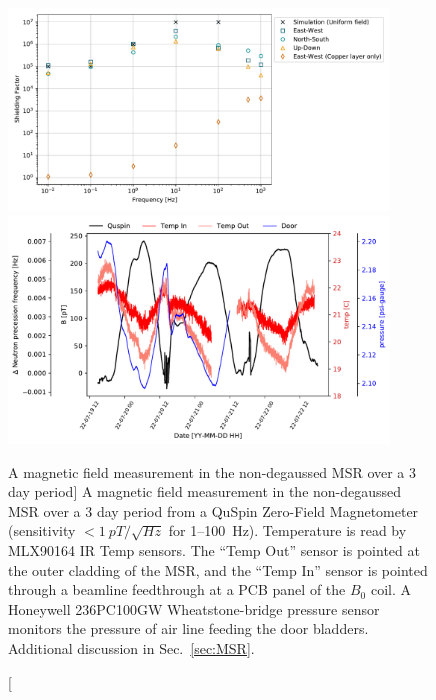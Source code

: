 \begin{figure}
    \centering
    \includegraphics[width=0.9\textwidth]{figures/chupp_msr_data.pdf}
    \caption
    {Calculated shielding factor of the LANL nEDM MSR (Tab.~\ref{tb:lanl_msr_shielding_factor}) for various orientations excitation signal directions of an infinitely sized coil. See Sec.~\ref{sec:MSR} for methodology.}
    \label{fig:MSR-shielding-factor}
    \vspace{\baselineskip}
    \centering
    \includegraphics[width=0.9\textwidth]{figures/long_term_msr_measurements.pdf}
    \caption
    [A magnetic field measurement in the non-degaussed MSR over a 3 day period]
    {A magnetic field measurement in the non-degaussed MSR over a 3 day period from a QuSpin Zero-Field Magnetometer  (sensitivity $<\qty{1}{pT\per\sqrt{Hz}}$ for 1--\qty{100}{\hertz}). Temperature is read by MLX90164 IR Temp sensors. The ``Temp Out'' sensor  is pointed at the outer cladding of the MSR, and the ``Temp In'' sensor  is pointed through a beamline feedthrough at a PCB panel of the $B_0$ coil. A Honeywell 236PC100GW Wheatstone-bridge pressure sensor  monitors the pressure of air line feeding the door bladders. Additional discussion in Sec.~\ref{sec:MSR}.}
    \label{fig:MSR_long_term_measurements}
\end{figure}

